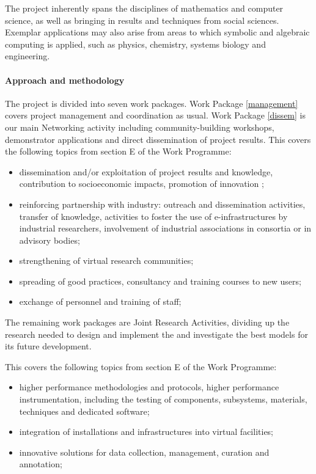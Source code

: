 The project inherently spans the disciplines of mathematics and
computer science, as well as bringing in results and techniques from
social sciences. Exemplar applications may also arise from areas to
which symbolic and algebraic computing is applied, such as physics,
chemistry, systems biology and engineering.

\paragraph{Approach and methodology}

The project is divided into seven work packages. Work Package
\ref{management} covers project management and coordination as
usual. Work Package \ref{dissem} is our main Networking activity
including community-building workshops, demonstrator applications and
direct dissemination of project results.
This covers the following topics from section E of the Work Programme:
\begin{itemize}
\item  dissemination and/or exploitation of project results and knowledge, contribution to socioeconomic
impacts, promotion of innovation ;
\item reinforcing partnership with industry: outreach and dissemination activities, transfer of
knowledge, activities to foster the use of e-infrastructures by industrial researchers,
involvement of industrial associations in consortia or in advisory bodies;
\item strengthening of virtual research communities;
\item spreading of good practices, consultancy and training courses to new users;
\item exchange of personnel and training of staff;
\end{itemize}


The remaining work packages are Joint Research Activities, dividing up
the research needed to design and implement the \TheProject and
investigate the best models for its future development. 

This covers the following topics from section E of the Work Programme:

\begin{itemize}
\item higher performance methodologies and protocols, higher performance instrumentation,
including the testing of components, subsystems, materials, techniques and dedicated
software;
\item integration of installations and infrastructures into virtual facilities;
\item innovative solutions for data collection, management, curation
  and annotation;
\end{itemize}

